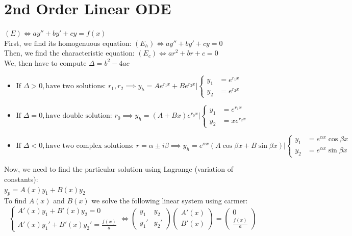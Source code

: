 \documentclass{article}
\begin{document}
\section{2nd Order Linear ODE}
$(E) \iff ay''+ by' + cy= f(x)$\\
First, we find its homogenuous equation: $(E_{h}) \iff ay''+ by' + cy= 0$\\
Then,  we find the characteristic equation: $(E_{c}) \iff ar^2 + br + c = 0$\\
We, then have to compute $\Delta = b^2 - 4ac$\\
\begin{itemize}
    \item $\text{If }\Delta > 0, \text{have two solutions: }r_{1}, r_{2}
    \implies y_{h} = Ae^{r_{1}x} + Be^{r_{2}x} |
    \begin{cases} 
        y_{1} &= e^{r_{1}x}  \\
        y_{2} &= e^{r_{2}x}
    \end{cases}$ \\
    \item $\text{If }\Delta = 0, \text{have double solution: }r_0
    \implies y_{h} = (A+Bx)e^{r_{0}x} | 
    \begin{cases} 
        y_{1} &= e^{r_{1}x}  \\
        y_{2} &= xe^{r_{2}x}
    \end{cases}$ \\
    \item $\text{If }\Delta < 0, \text{have two complex solutions: }r = \alpha \pm i\beta 
    \implies y_{h} = e^{\alpha x}(A\cos{\beta x} + B\sin{\beta x}) |
    \begin{cases} 
    y_{1} &= e^{\alpha x}\cos{\beta x}  \\
    y_{2} &= e^{\alpha x}\sin{\beta x}
    \end{cases}$
\end{itemize}

Now, we need to find the particular solution using Lagrange (variation of constants): \\
$y_{p} = A(x) y_{1}+ B(x) y_{2}$ \\
To find $A(x)$ and $B(x)$ we solve the following linear system using carmer:
\[
    \begin{cases}
        A'(x)y_{1} + B'(x)y_{2} = 0 \\
        A'(x)y_{1}' + B'(x)y_{2}' = \frac{f(x)}{a}
    \end{cases} \iff 
    \begin{pmatrix}
        y_{1} & y_{2}\\
        y_{1}' & y_{2}' 
    \end{pmatrix}\begin{pmatrix}
        A'(x)\\
        B'(x)
        \end{pmatrix} = \begin{pmatrix}
        0 \\
        \frac{f(x)}{a}
        \end{pmatrix}
\]
\end{document}
